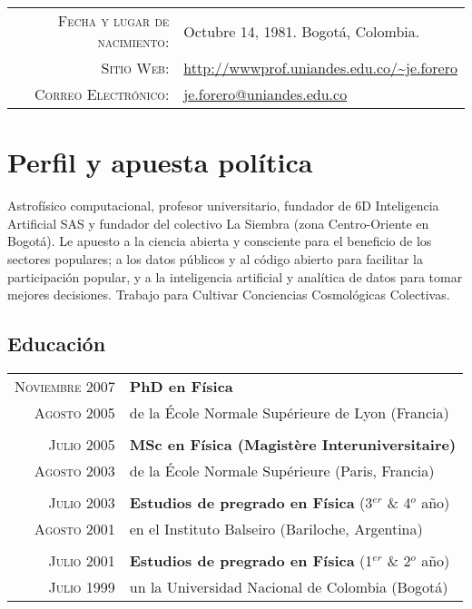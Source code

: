 \documentclass[a4paper,10pt]{article} %
\begin{document}
\pagestyle{empty} %




\par{ \bigskip\par} %


\begin{tabular}{rl}
\textsc{Fecha y lugar de nacimiento:} & Octubre 14, 1981. Bogotá, Colombia.\\
\textsc{Sitio Web:} & \url{http://wwwprof.uniandes.edu.co/~je.forero}\\
\textsc{Correo Electrónico:} & \href{mailto:je.forero@uniandes.edu.co}{je.forero@uniandes.edu.co}\\
\end{tabular}


\color{red}
\section{Perfil y apuesta política}
\color{black}

Astrofísico computacional, profesor universitario, fundador de 6D Inteligencia Artificial SAS y
fundador del colectivo La Siembra (zona Centro-Oriente en Bogotá). Le apuesto a la ciencia 
abierta y consciente para el beneficio de los sectores populares;
a los datos públicos y al código abierto para facilitar la participación popular, y a la
inteligencia artificial y analítica de datos para tomar mejores decisiones.
Trabajo para Cultivar Conciencias Cosmológicas Colectivas.
\color{red}
\subsection{Educación}
\color{black}


\begin{tabular}{rl}	
\textsc{Noviembre 2007} & {\bf PhD en Física}\\
\textsc{Agosto 2005}& de la \'Ecole Normale Sup\'erieure de Lyon (Francia) \\
&\\
\textsc{Julio 2005} & {\bf MSc en Física (Magist\`ere Interuniversitaire)}\\  
\textsc{Agosto 2003}& de la \'Ecole Normale Sup\'erieure (Paris, Francia) \\
&\\
\textsc{Julio 2003} & {\bf Estudios de pregrado en Física} (3$^{er}$ \& 4$^{o}$ año)\\
\textsc{Agosto 2001} & en el Instituto Balseiro (Bariloche, Argentina)\\
&\\
\textsc{Julio 2001}  & {\bf Estudios de pregrado en Física} (1$^{er}$ \& 2$^{o}$ año)\\
\textsc{Julio 1999}& un la Universidad Nacional de Colombia (Bogotá)\\
\end{tabular}
\end{document}
